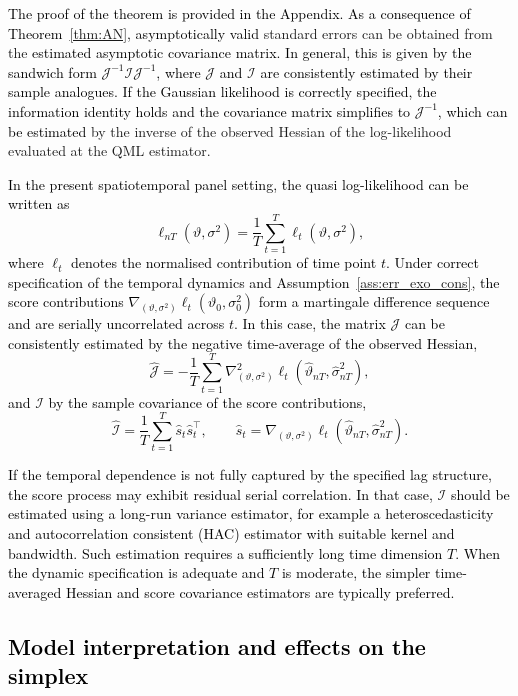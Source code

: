 \documentclass[12pt]{article}
\theoremstyle{plain}
\theoremstyle{definition}
\begin{document}
\textcolor{black}{The proof of the theorem is provided in the Appendix. As a consequence of Theorem~\ref{thm:AN}, asymptotically valid} standard errors can be obtained from the \textcolor{black}{estimated asymptotic covariance matrix. In general, this is given by the sandwich form $\mathcal{J}^{-1}\mathcal{I}\mathcal{J}^{-1}$, where $\mathcal{J}$ and $\mathcal{I}$ are consistently estimated by their sample analogues. If the Gaussian likelihood is correctly specified, the information identity holds and the covariance matrix simplifies to $\mathcal{J}^{-1}$, which can be estimated} by the inverse of the observed Hessian of the log-likelihood evaluated at the QML estimator.


\textcolor{black}{In the present spatiotemporal panel setting, the quasi log-likelihood can be written as
\[
\ell_{nT}(\vartheta,\sigma^2)
=
\frac{1}{T}\sum_{t=1}^T \ell_t(\vartheta,\sigma^2),
\]
where $\ell_t$ denotes the normalised contribution of time point $t$.  Under correct specification of the temporal dynamics and Assumption~\ref{ass:err_exo_cons},  the score contributions  $\nabla_{(\vartheta,\sigma^2)} \ell_t(\vartheta_0,\sigma_0^2)$  form a martingale difference sequence and are serially uncorrelated across $t$.  In this case, the matrix $\mathcal{J}$ can be consistently estimated by the negative time-average of the observed Hessian,
\[
\widehat{\mathcal{J}}
=
-
\frac{1}{T}
\sum_{t=1}^T
\nabla^2_{(\vartheta,\sigma^2)} 
\ell_t(\hat\vartheta_{nT},\hat\sigma^2_{nT}),
\]
and $\mathcal{I}$ by the sample covariance of the score contributions,
\[
\widehat{\mathcal{I}}
=
\frac{1}{T}
\sum_{t=1}^T
\hat{s}_t \hat{s}_t^\top,
\qquad
\hat{s}_t
=
\nabla_{(\vartheta,\sigma^2)}
\ell_t(\hat\vartheta_{nT},\hat\sigma^2_{nT}).
\]
}

\textcolor{black}{If the temporal dependence is not fully captured by the specified lag structure,  the score process may exhibit residual serial correlation.  In that case, $\mathcal{I}$ should be estimated using a long-run variance estimator,  for example a heteroscedasticity and autocorrelation consistent (HAC) estimator with suitable kernel and bandwidth.  Such estimation requires a sufficiently long time dimension $T$. When the dynamic specification is adequate and $T$ is moderate, the simpler time-averaged Hessian and score covariance estimators are typically preferred.}





\subsection{\textcolor{black}{Model interpretation and effects on the simplex}}
\end{document}
